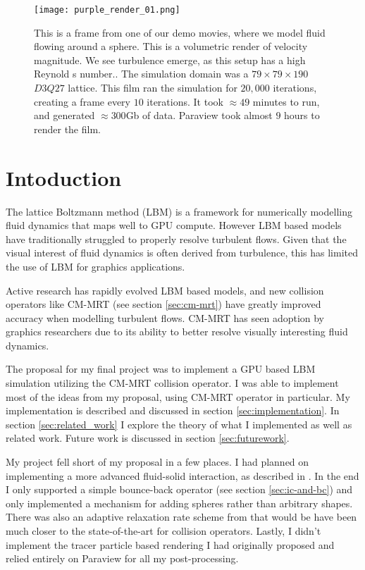 \begin{figure*}
\begin{center}
  \texttt{[image: purple\_render\_01.png]}
\end{center}
\caption{This is a frame from one of our demo movies,
  where we model fluid flowing around a sphere.
  This is a volumetric render of velocity magnitude. 
  We see turbulence emerge, as this setup has a high Reynold
  s number..
  The simulation domain was a $79 \times 79 \times 190$ 
  $D3Q27$ lattice. 
  This film ran the simulation for $20,000$ iterations,
  creating a frame every $10$ iterations.
It took $\approx 49$ minutes to run, 
and generated $\approx 300$Gb of data.
Paraview took almost $9$ hours to render the film.}
\label{fig:movie-frame}
\end{figure*}

\section{Intoduction}

The lattice Boltzmann method (LBM) 
is a framework for numerically modelling fluid dynamics
that maps well to GPU compute.
However LBM based models have traditionally struggled to 
properly resolve turbulent flows.
Given that the visual interest of fluid dynamics is often 
derived from turbulence, this has limited the use of LBM 
for graphics applications.

Active research has rapidly evolved LBM based models,
and new collision operators like CM-MRT (see section \ref{sec:cm-mrt})
have greatly improved accuracy when modelling turbulent flows.
CM-MRT has seen adoption by graphics 
researchers \cite{Li2020, Li2024, Lyu2021} due
to its ability to better resolve visually interesting
fluid dynamics.

The proposal for my final project was to
implement a GPU based LBM simulation utilizing the CM-MRT collision 
operator.
I was able to implement most of the ideas from
my proposal, using CM-MRT operator in particular.
My implementation is described and discussed in section 
\ref{sec:implementation}.
In section \ref{sec:related_work} I explore the theory
of what I implemented as well as related work.
Future work is discussed in section \ref{sec:futurework}.


My project fell short of my proposal in a few places.
I had planned on implementing a more advanced fluid-solid
interaction, as described in \cite{Lyu2021}.
In the end I only supported a simple bounce-back operator 
(see section \ref{sec:ic-and-bc}) and only implemented a mechanism
for adding spheres rather than arbitrary shapes.
There was also an adaptive relaxation rate scheme from \cite{Li2020}
that would be have been much closer to the state-of-the-art for 
collision operators.
Lastly, I didn't implement the tracer particle based rendering
I had originally proposed and relied entirely on Paraview 
for all my post-processing.

